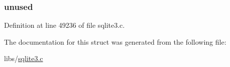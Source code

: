 \subsubsection[{unused}]{ unused}\label{struct_wal_index_hdr_a4884baf6a3e410b581a16e00353028b6}


Definition at line 49236 of file sqlite3.\+c.



The documentation for this struct was generated from the following file\+:\begin{DoxyCompactItemize}
\item 
libs/\hyperlink{sqlite3_8c}{sqlite3.\+c}\end{DoxyCompactItemize}
